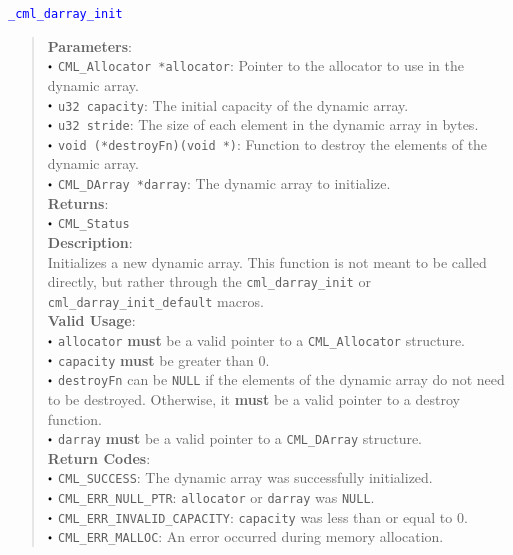 \documentclass[a4paper,oneside,8pt]{extarticle}
\newcommand{\function}[1]{
  \noindent\textcolor{blue}{\texttt{#1}}
  \vspace{-0.3em}
}
\renewcommand{\dot}{\raisebox{0.3ex}{\scalebox{0.6}{$\bullet$}}}
\theoremstyle{definition}
\begin{document}
\function{\_cml\_darray\_init}
\begin{quote}
  \textbf{Parameters}: \\
  $\dot$ \texttt{CML\_Allocator *allocator}: Pointer to the allocator to use in the dynamic array. \\
  $\dot$ \texttt{u32 capacity}: The initial capacity of the dynamic array. \\
  $\dot$ \texttt{u32 stride}: The size of each element in the dynamic array in bytes. \\
  $\dot$ \texttt{void (*destroyFn)(void *)}: Function to destroy the elements of the dynamic array. \\
  $\dot$ \texttt{CML\_DArray *darray}: The dynamic array to initialize. \\
  \textbf{Returns}: \\
  $\dot$ \texttt{CML\_Status} \\
  
  \vspace{-0.75em}
  \textbf{Description}: \\
  Initializes a new dynamic array. This function is not meant to be called directly, but rather through the \texttt{cml\_darray\_init} or \texttt{cml\_darray\_init\_default} macros. \\

  \vspace{-0.75em}
  \textbf{Valid Usage}: \\
  $\dot$ \texttt{allocator} \textbf{must} be a valid pointer to a \texttt{CML\_Allocator} structure. \\
  $\dot$ \texttt{capacity} \textbf{must} be greater than 0. \\
  $\dot$ \texttt{destroyFn} can be \texttt{NULL} if the elements of the dynamic array do not need to be destroyed. Otherwise, it \textbf{must} be a valid pointer to a destroy function. \\
  $\dot$ \texttt{darray} \textbf{must} be a valid pointer to a \texttt{CML\_DArray} structure. \\

  \vspace{-0.75em}
  \textbf{Return Codes}: \\
  $\dot$ \texttt{CML\_SUCCESS}: The dynamic array was successfully initialized. \\
  $\dot$ \texttt{CML\_ERR\_NULL\_PTR}: \texttt{allocator} or \texttt{darray} was \texttt{NULL}. \\
  $\dot$ \texttt{CML\_ERR\_INVALID\_CAPACITY}: \texttt{capacity} was
  less than or equal to 0. \\
  $\dot$ \texttt{CML\_ERR\_MALLOC}: An error occurred during memory allocation. \\
\end{quote}
\end{document}
